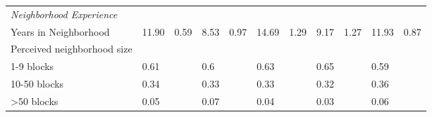 \begin{sidewaystable}[ht]
\begin{tabular}{lR{.4in}R{.4in}R{.4in}R{.4in}R{.4in}R{.4in}R{.4in}R{.4in}R{.4in}R{.4in}}
  \emph{Neighborhood Experience}\\Years in Neighborhood & 11.90 & 0.59 & 8.53 & 0.97 & 14.69 & 1.29 & 9.17 & 1.27 & 11.93 & 0.87 \\ 
  Perceived neighborhood size\\1-9 blocks &  0.61 &  & 0.6 &  & 0.63 &  & 0.65 &  & 0.59 &  \\ 
  10-50 blocks &  0.34 &  & 0.33 &  & 0.33 &  & 0.32 &  & 0.36 &  \\ 
  >50 blocks &  0.05 &  & 0.07 &  & 0.04 &  & 0.03 &  & 0.06 &  \\ 
   \bottomrule
\end{tabular}
\end{sidewaystable}
